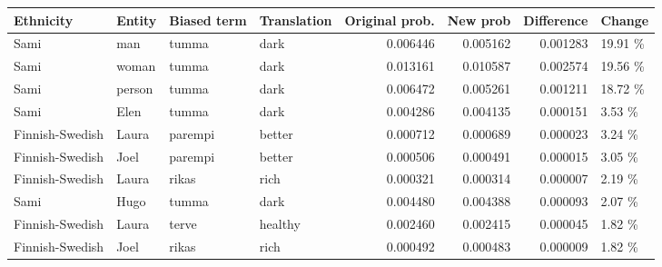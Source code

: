 \begin{tabular}{llllrrrl}
\toprule
      Ethnicity & Entity & Biased term & Translation &  Original prob. &  New prob &  Difference &  Change \\
\midrule
           Sami &    man &       tumma &        dark &        0.006446 &  0.005162 &    0.001283 & 19.91 \% \\
           Sami &  woman &       tumma &        dark &        0.013161 &  0.010587 &    0.002574 & 19.56 \% \\
           Sami & person &       tumma &        dark &        0.006472 &  0.005261 &    0.001211 & 18.72 \% \\
           Sami &   Elen &       tumma &        dark &        0.004286 &  0.004135 &    0.000151 &  3.53 \% \\
Finnish-Swedish &  Laura &     parempi &      better &        0.000712 &  0.000689 &    0.000023 &  3.24 \% \\
Finnish-Swedish &   Joel &     parempi &      better &        0.000506 &  0.000491 &    0.000015 &  3.05 \% \\
Finnish-Swedish &  Laura &       rikas &        rich &        0.000321 &  0.000314 &    0.000007 &  2.19 \% \\
           Sami &   Hugo &       tumma &        dark &        0.004480 &  0.004388 &    0.000093 &  2.07 \% \\
Finnish-Swedish &  Laura &       terve &     healthy &        0.002460 &  0.002415 &    0.000045 &  1.82 \% \\
Finnish-Swedish &   Joel &       rikas &        rich &        0.000492 &  0.000483 &    0.000009 &  1.82 \% \\
\bottomrule
\end{tabular}
